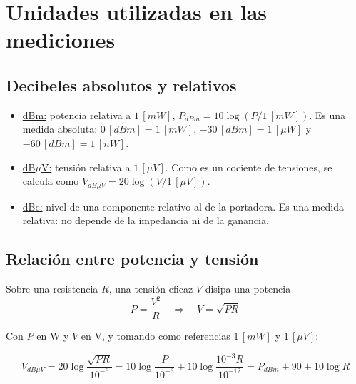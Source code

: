 \section{Unidades utilizadas en las mediciones}
\label{sec:niveles}

\subsection{Decibeles absolutos y relativos}
\begin{itemize}
    \item \underline{dBm:} potencia relativa a $1 \, [mW]$, $P_{dBm} = 10 \log\left(P / 1 \, [mW]\right)$. Es una medida absoluta: $0 \, [dBm] = 1 \, [mW]$, $-30 \, [dBm] = 1 \, [\mu W]$ y $-60 \, [dBm] = 1 \, [nW]$.
    \item \underline{dB$\mu$V:} tensión relativa a $1 \, [\mu V]$. Como es un cociente de tensiones, se calcula como $V_{dB\mu V} = 20 \log\left(V / 1 \, [\mu V]\right)$.
    \item \underline{dBc:} nivel de una componente relativo al de la portadora. Es una medida relativa: no depende de la impedancia ni de la ganancia.
\end{itemize}

\subsection{Relación entre potencia y tensión}
Sobre una resistencia $R$, una tensión eficaz $V$ disipa una potencia
\begin{equation}
    P = \frac{V^2}{R} \quad \Rightarrow \quad V = \sqrt{P R}
    \label{eq:p_v}
\end{equation}

Con $P$ en W y $V$ en V, y tomando como referencias $1 \, [mW]$ y $1 \, [\mu V]$:

\begin{equation}
    V_{dB\mu V} = 20 \log\frac{\sqrt{P R}}{10^{-6}}
    = 10 \log\frac{P}{10^{-3}} + 10 \log\frac{10^{-3} R}{10^{-12}}
    = P_{dBm} + 90 + 10 \log R
    \label{eq:dbm_dbuv}
\end{equation}

